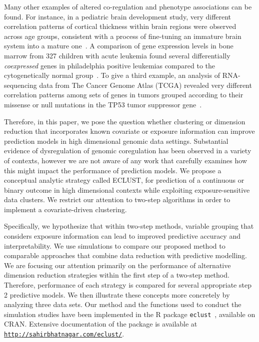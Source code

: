 

Many other examples of altered co-regulation and phenotype associations can be found.   For instance, in a pediatric brain development study, very different correlation patterns of cortical thickness within brain regions were observed across age groups, consistent with a process of fine-tuning an immature brain system into a mature one~\citep{khundrakpam2013developmental}.  A comparison of gene expression levels in bone marrow from 327 children with acute leukemia found several differentially \emph{coexpressed} genes in philadelphia positive leukemias compared to the cytogenetically normal group~\citep{kostka2004finding}.   To give a third example, an analysis of RNA-sequencing data from The Cancer Genome Atlas (TCGA) revealed very different correlation patterns among sets of genes in tumors grouped according to their missense or null mutations in the TP53 tumor suppressor gene~\citep{klein2016gene}. 

Therefore, in this paper, we pose the question whether clustering or dimension reduction that incorporates known covariate or exposure information can improve prediction models in high dimensional genomic data settings. Substantial evidence of dysregulation of genomic coregulation has been observed in a variety of contexts, however we are not aware of any work that carefully examines how this might impact the performance of prediction models. We propose a conceptual analytic strategy called ECLUST, for prediction of a continuous or binary outcome in high dimensional contexts while exploiting exposure-sensitive data clusters. We restrict our attention to two-step algorithms in order to implement a covariate-driven clustering. 

Specifically, we hypothesize that within two-step methods, variable grouping that considers exposure information can lead to improved predictive accuracy and interpretability. We use simulations to compare our proposed method to comparable  approaches that combine data reduction with predictive modelling. We are focusing our attention primarily on the performance of alternative dimension reduction strategies within the first step of a two-step method.  Therefore, performance of each strategy is compared for several appropriate step 2 predictive models. We then illustrate these concepts more concretely  by analyzing three data sets. Our method and the functions used to conduct the simulation studies have been implemented in the R package \texttt{eclust}~\citep{eclust}, available on CRAN. Extensive documentation of the package is available at \texttt{\url{http://sahirbhatnagar.com/eclust/}}.


